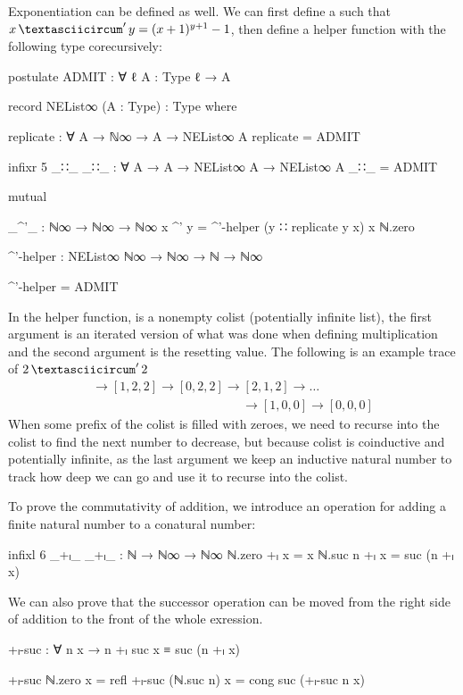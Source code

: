 Exponentiation can be defined as well. We can first define a
 such that $x \mathop{\textasciicircum}' y =
(x+1)^{y+1}-1$, then define a helper function with the following type
corecursively:
\begin{code}[hide]
postulate
  ADMIT : ∀ {ℓ} {A : Type ℓ} → A

record NEList∞ (A : Type) : Type where

replicate : ∀ {A} → ℕ∞ → A → NEList∞ A
replicate = ADMIT

infixr 5 _∷_
_∷_ : ∀ {A} → A → NEList∞ A → NEList∞ A
_∷_ = ADMIT

mutual
\end{code}
\begin{code}
  _^'_ : ℕ∞ → ℕ∞ → ℕ∞
  x ^' y = ^'-helper (y ∷ replicate y x) x ℕ.zero

  ^'-helper : NEList∞ ℕ∞ → ℕ∞ → ℕ → ℕ∞
\end{code}
\begin{code}[hide]
  ^'-helper = ADMIT
\end{code}
In the helper function,  is a nonempty colist (potentially
infinite list), the first argument is an iterated version of what was done when
defining multiplication and the second argument is the resetting value. The
following is an example trace of $2 \mathop{\textasciicircum}' 2$
\begin{gather*}
  [2, 2, 2] \to [1, 2, 2] \to [0, 2, 2] \to [2, 1, 2] \to \dots \\
  \qquad\qquad\qquad\qquad\qquad\qquad\to [1, 0, 0] \to [0, 0, 0]
\end{gather*}
When some prefix of the colist is filled with zeroes, we need to recurse into
the colist to find the next number to decrease, but because colist is
coinductive and potentially infinite, as the last argument we keep an inductive
natural number to track how deep we can go and use it to recurse into the
colist.

To prove the commutativity of addition, we introduce an operation for adding a
finite natural number to a conatural number:
\begin{code}
infixl 6 _+ₗ_
_+ₗ_ : ℕ → ℕ∞ → ℕ∞
ℕ.zero +ₗ x = x
ℕ.suc n +ₗ x = suc (n +ₗ x)
\end{code}
We can also prove that the successor operation can be moved from the right side
of addition to the front of the whole exression.
\begin{code}
+ₗ-suc : ∀ n x → n +ₗ suc x ≡ suc (n +ₗ x)
\end{code}
\begin{code}[hide]
+ₗ-suc ℕ.zero x = refl
+ₗ-suc (ℕ.suc n) x = cong suc (+ₗ-suc n x)
\end{code}

